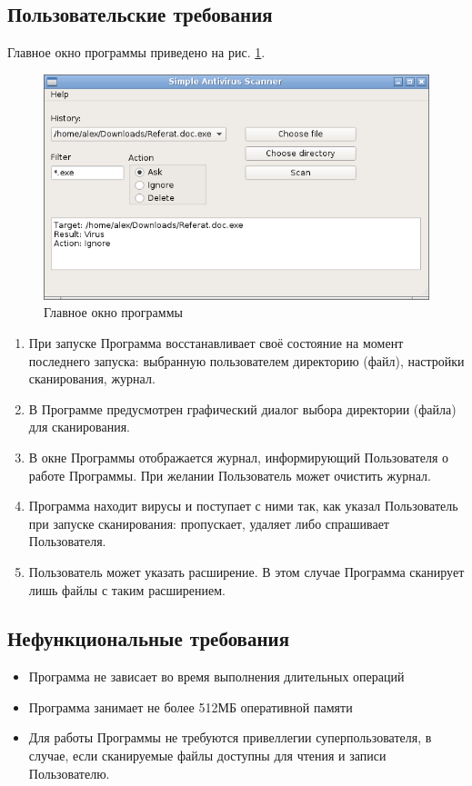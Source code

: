 \subsection{Пользовательские требования}
Главное окно программы приведено на рис. \ref{fig:mainwindow}.
\begin{figure}
\centering
\includegraphics[width=\textwidth]{mainwindow}
\caption{Главное окно программы}
\label{fig:mainwindow}
\end{figure}
\begin{enumerate}
\item При запуске Программа восстанавливает своё состояние на момент последнего запуска: выбранную пользователем директорию (файл), настройки сканирования, журнал.
\item В Программе предусмотрен графический диалог выбора директории (файла) для сканирования.
\item В окне Программы отображается журнал, информирующий Пользователя о работе Программы. При желании Пользователь может очистить журнал.
\item Программа находит вирусы и поступает с ними так, как указал Пользователь при запуске сканирования: пропускает, удаляет либо спрашивает Пользователя.
\item Пользователь может указать расширение. В этом случае Программа сканирует лишь файлы с таким расширением.
\end{enumerate}
\subsection{Нефункциональные требования}
\begin{itemize}
\item Программа не зависает во время выполнения длительных операций
\item Программа занимает не более 512МБ оперативной памяти
\item Для работы Программы не требуются привеллегии суперпользователя, в случае, если сканируемые файлы доступны для чтения и записи Пользователю.
\end{itemize}
